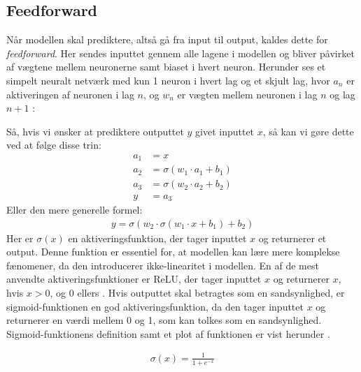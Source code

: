 \documentclass{article}
\begin{document}
\subsection{Feedforward}
Når modellen skal prediktere, altså gå fra input til output, kaldes dette for \textit{feedforward}. Her sendes inputtet gennem alle lagene i modellen og bliver påvirket af vægtene mellem neuronerne samt biaset i hvert neuron. Herunder ses et simpelt neuralt netværk med kun 1 neuron i hvert lag og et skjult lag, hvor $a_n$ er aktiveringen af neuronen i lag $n$, og $w_n$ er vægten mellem neuronen i lag $n$ og lag $n+1$ \parencite{sanderson2017neural}:
\begin{center}

\label{fig:neural_network2}
\end{center}
Så, hvis vi ønsker at prediktere outputtet $y$ givet inputtet $x$, så kan vi gøre dette ved at følge disse trin: \\
\begin{align}
a_1 &= x
\\
a_2 &= \sigma(w_1 \cdot a_1 + b_1)
\\
a_3 &= \sigma(w_2 \cdot a_2 + b_2)
\\
y &= a_3
\end{align}
Eller den mere generelle formel:
\begin{align}
  y = \sigma(w_2 \cdot \sigma(w_1 \cdot x + b_1) + b_2)
\end{align}
Her er $\sigma(x)$ en aktiveringsfunktion, der tager inputtet $x$ og returnerer et output. Denne funktion er essentiel for, at modellen kan lære mere komplekse fænomener, da den introducerer ikke-linearitet i modellen. En af de mest anvendte aktiveringsfunktioner er ReLU, der tager inputtet $x$ og returnerer $x$, hvis $x > 0$, og 0 ellers \parencite{Sanderson_2017}. Hvis outputtet skal betragtes som en sandsynlighed, er sigmoid-funktionen en god aktiveringsfunktion, da den tager inputtet $x$ og returnerer en værdi mellem 0 og 1, som kan tolkes som en sandsynlighed. Sigmoid-funktionens definition samt et plot af funktionen er vist herunder \parencite{Nielsen_2019a}.\\
\begin{minipage}{0.4\textwidth}
  \begin{align}
    \sigma(x) = \frac{1}{1 + e^{-x}}
  \end{align}
\end{minipage}
\begin{minipage}{0.6\textwidth}
  \begin{center}
    \label{fig:sigmoid}
  \end{center}
\end{minipage}
\end{document}
